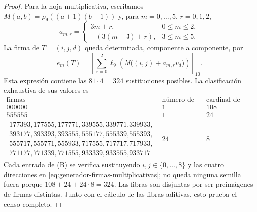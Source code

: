 \begin{proof}
Para la hoja multiplicativa, escribamos
\(M(a,b)=\rho_9((a+1)(b+1))\) y, para \(m=0,\ldots,5\), \(r=0,1,2\),
\[
 a_{m,r}=\begin{cases}
 3m+r,&0\le m\le2,\\
 -(3(m-3)+r),&3\le m\le5.
 \end{cases}
\]
La firma de \(T=(i,j,d)\) queda determinada, componente a componente, por
\begin{equation}
 e_m(T)=\left[\sum_{r=0}^{2}
 \ell_9\!\left(M\bigl((i,j)+a_{m,r}v_d\bigr)\right)\right]_{10}.
 \label{eq:generador-firmas-multiplicativas}
\end{equation}
Esta expresión contiene las \(81\cdot4=324\) sustituciones posibles. La
clasificación exhaustiva de sus valores es
\[
\begin{array}{c|c|c}
\text{firmas}&\text{número de firmas}&\text{cardinal de cada fibra}\\ \hline
000000&1&108\\
555555&1&24\\
\begin{gathered}
177393,177555,177771,339555,339771,339933,\\
393177,393393,393555,555177,555339,555393,\\
555717,555771,555933,717555,717717,717933,\\
771177,771339,771555,933339,933555,933717
\end{gathered}&24&8
\end{array}
\tag{B}
\label{eq:tabla-firmas-multiplicativas}
\]
Cada entrada de (B) se verifica sustituyendo \(i,j\in\{0,\ldots,8\}\) y
las cuatro direcciones en \eqref{eq:generador-firmas-multiplicativas}; no
queda ninguna semilla fuera porque
\(108+24+24\cdot8=324\). Las fibras son disjuntas por ser preimágenes de
firmas distintas. Junto con el cálculo de las fibras aditivas, esto prueba el
censo completo.
\end{proof}

